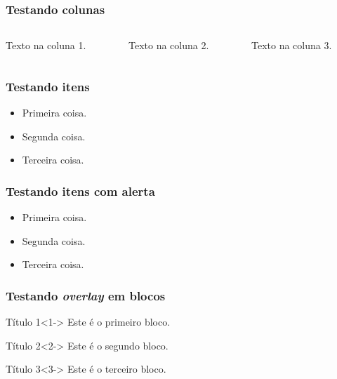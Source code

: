 \documentclass{beamer}
\begin{document}
	\begin{frame}
		\frametitle{Testando colunas}
		\begin{columns}
			\begin{column}[t]{3cm}
				Texto na coluna 1.
			\end{column}
			\begin{column}[t]{3cm}
				Texto na coluna 2.
			\end{column}
			\begin{column}[t]{3cm}
				Texto na coluna 3.
			\end{column}
		\end{columns}
	\end{frame}
	
	\begin{frame}
		\frametitle{Testando itens}
		\begin{itemize}
			\item<1-> Primeira coisa.
			\item<2-> Segunda coisa.
			\item<3-> Terceira coisa.
		\end{itemize}
	\end{frame}
	
	\begin{frame}
		\frametitle{Testando itens com alerta}
		\begin{itemize}
			\item<1-|alert@1> Primeira coisa.
			\item<2-|alert@2> Segunda coisa.
			\item<3-|alert@3> Terceira coisa.
		\end{itemize}
	\end{frame}
	
	\begin{frame}
		\frametitle{Testando \textit{overlay} em blocos}
		\begin{block}{Título 1}<1->
			Este é o primeiro bloco.
		\end{block}
		\begin{block}{Título 2}<2->
			Este é o segundo bloco.
		\end{block}
		\begin{block}{Título 3}<3->
			Este é o terceiro bloco.
		\end{block}
	\end{frame}
	
\end{document}
